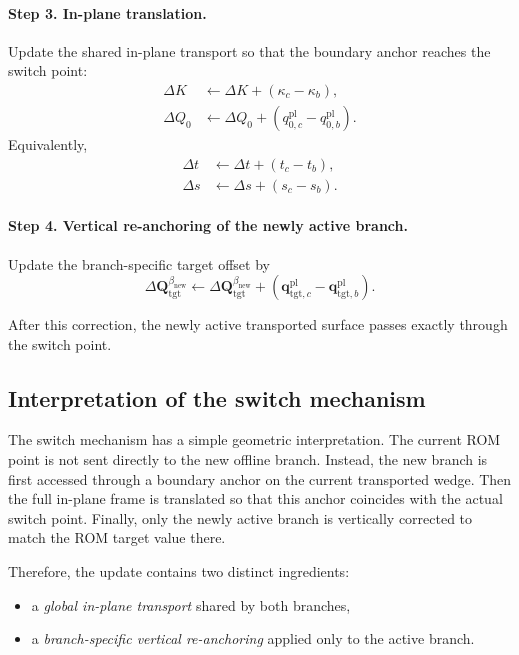 \documentclass[11pt,a4paper]{article}
\begin{document}
\paragraph{Step 3. In-plane translation.}
Update the shared in-plane transport so that the boundary anchor reaches the switch point:
\begin{align}
\Delta K &\leftarrow \Delta K + (\kappa_c-\kappa_b),
\label{eq:update_deltaK_transport_ref}
\\
\Delta Q_0 &\leftarrow \Delta Q_0 + (q^{\mathrm{pl}}_{0,c}-q^{\mathrm{pl}}_{0,b}).
\label{eq:update_deltaQ0_transport_ref}
\end{align}
Equivalently,
\begin{align}
\Delta t &\leftarrow \Delta t + (t_c-t_b),
\label{eq:update_deltat_transport_ref}
\\
\Delta s &\leftarrow \Delta s + (s_c-s_b).
\label{eq:update_deltas_transport_ref}
\end{align}

\paragraph{Step 4. Vertical re-anchoring of the newly active branch.}
Update the branch-specific target offset by
\begin{equation}
\Delta \mathbf{Q}_{\mathrm{tgt}}^{\beta_{\mathrm{new}}}
\leftarrow
\Delta \mathbf{Q}_{\mathrm{tgt}}^{\beta_{\mathrm{new}}}
+
\left(
\mathbf{q}^{\mathrm{pl}}_{\mathrm{tgt},c}
-
\mathbf{q}^{\mathrm{pl}}_{\mathrm{tgt},b}
\right).
\label{eq:update_deltaQ_target_transport_ref}
\end{equation}

After this correction, the newly active transported surface passes exactly through the switch point.

\subsection{Interpretation of the switch mechanism}

The switch mechanism has a simple geometric interpretation. The current ROM point is not sent directly to the new offline branch. Instead, the new branch is first accessed through a boundary anchor on the current transported wedge. Then the full in-plane frame is translated so that this anchor coincides with the actual switch point. Finally, only the newly active branch is vertically corrected to match the ROM target value there.

Therefore, the update contains two distinct ingredients:
\begin{itemize}
\item a \emph{global in-plane transport} shared by both branches,
\item a \emph{branch-specific vertical re-anchoring} applied only to the active branch.
\end{itemize}
\end{document}
